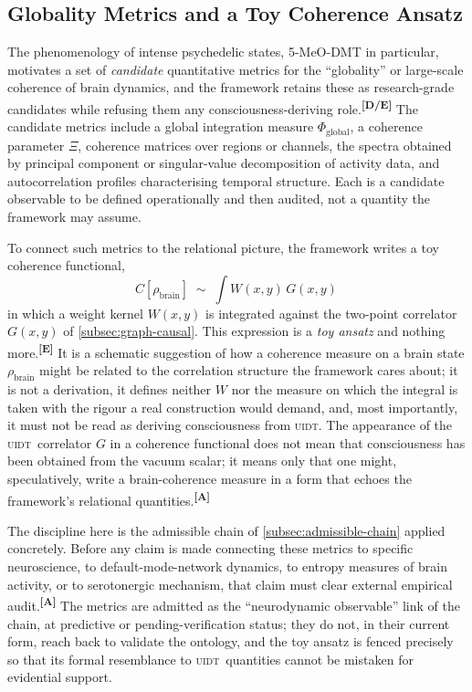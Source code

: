\documentclass[12pt,a4paper,twoside]{article}
\theoremstyle{plain}
\theoremstyle{definition}
\theoremstyle{remark}
\newcommand{\UIDT}{\textsc{uidt}}
\newcommand{\catmark}[1]{\textsuperscript{\textsf{\textbf{[#1]}}}}
\begin{document}
\subsection{Globality Metrics and a Toy Coherence Ansatz}
\label{subsec:globality-metrics}

The phenomenology of intense psychedelic states, 5-MeO-DMT in particular, motivates a set of \emph{candidate} quantitative metrics for the ``globality'' or large-scale coherence of brain dynamics, and the framework retains these as research-grade candidates while refusing them any consciousness-deriving role.\catmark{D/E} The candidate metrics include a global integration measure $\Phi_{\mathrm{global}}$, a coherence parameter $\Xi$, coherence matrices over regions or channels, the spectra obtained by principal component or singular-value decomposition of activity data, and autocorrelation profiles characterising temporal structure. Each is a candidate observable to be defined operationally and then audited, not a quantity the framework may assume.

To connect such metrics to the relational picture, the framework writes a toy coherence functional,
\[
 C[\rho_{\mathrm{brain}}] \;\sim\; \int W(x,y)\,G(x,y)\,
\]
in which a weight kernel $W(x,y)$ is integrated against the two-point correlator $G(x,y)$ of \cref{subsec:graph-causal}. This expression is a \emph{toy ansatz} and nothing more.\catmark{E} It is a schematic suggestion of how a coherence measure on a brain state $\rho_{\mathrm{brain}}$ might be related to the correlation structure the framework cares about; it is not a derivation, it defines neither $W$ nor the measure on which the integral is taken with the rigour a real construction would demand, and, most importantly, it must not be read as deriving consciousness from \UIDT. The appearance of the \UIDT\ correlator $G$ in a coherence functional does not mean that consciousness has been obtained from the vacuum scalar; it means only that one might, speculatively, write a brain-coherence measure in a form that echoes the framework's relational quantities.\catmark{A}

The discipline here is the admissible chain of \cref{subsec:admissible-chain} applied concretely. Before any claim is made connecting these metrics to specific neuroscience, to default-mode-network dynamics, to entropy measures of brain activity, or to serotonergic mechanism, that claim must clear external empirical audit.\catmark{A} The metrics are admitted as the ``neurodynamic observable'' link of the chain, at predictive or pending-verification status; they do not, in their current form, reach back to validate the ontology, and the toy ansatz is fenced precisely so that its formal resemblance to \UIDT\ quantities cannot be mistaken for evidential support.
\end{document}
